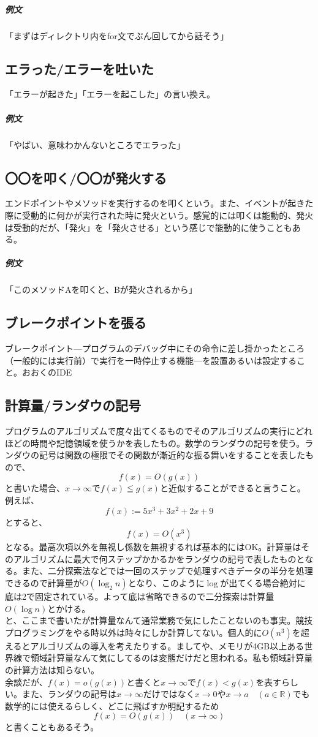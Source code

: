 \documentclass[dvipdfmx,jb5]{jreport}
\begin{document}
\subparagraph{例文}「まずはディレクトリ内をfor文でぶん回してから話そう」

\subsection{エラった/エラーを吐いた}
「エラーが起きた」「エラーを起こした」の言い換え。

\subparagraph{例文}「やばい、意味わかんないところでエラった」

\subsection{〇〇を叩く/〇〇が発火する}
エンドポイントやメソッドを実行するのを叩くという。また、イベントが起きた際に受動的に何かが実行された時に発火という。感覚的には叩くは能動的、発火は受動的だが、「発火」を「発火させる」という感じで能動的に使うこともある。

\subparagraph{例文}「このメソッドAを叩くと、Bが発火されるから」


\subsection{ブレークポイントを張る}
ブレークポイント---プログラムのデバッグ中にその命令に差し掛かったところ（一般的には実行前）で実行を一時停止する機能---を設置あるいは設定すること。おおくのIDE

\subsection{計算量/ランダウの記号}
プログラムのアルゴリズムで度々出てくるものでそのアルゴリズムの実行にどれほどの時間や記憶領域を使うかを表したもの。数学のランダウの記号を使う。ランダウの記号は関数の極限でその関数が漸近的な振る舞いをすることを表したもので、\[
      f(x) = O(g(x))
\]
と書いた場合、$x \to \infty$で$f(x) \leqq g(x)$と近似することができると言うこと。例えば、\[
      f(x) := 5x^3 + 3x^2 + 2x + 9
\]
とすると、\[
      f(x) = O(x^3)
\]
となる。最高次項以外を無視し係数を無視するれば基本的にはOK。計算量はそのアルゴリズムに最大で何ステップかかるかをランダウの記号で表したものとなる。また、二分探索法などでは一回のステップで処理すべきデータの半分を処理できるので計算量が$O(\log_2 n)$となり、このように$\log$が出てくる場合絶対に底は2で固定されている。よって底は省略できるので二分探索は計算量$O(\log n)$とかける。
\\

と、ここまで書いたが計算量なんて通常業務で気にしたことないのも事実。競技プログラミングをやる時以外は時々にしか計算してない。個人的に$O(n^3)$を超えるとアルゴリズムの導入を考えたりする。ましてや、メモリが4GB以上ある世界線で領域計算量なんて気にしてるのは変態だけだと思われる。私も領域計算量の計算方法は知らない。
\\

余談だが、$f(x) = o(g(x))$と書くと$x \to \infty$で$f(x) < g(x)$を表すらしい。また、ランダウの記号は$x \to \infty$だけではなく$x \to 0$や$x \to a \quad (a \in \mathbb{R})$でも数学的には使えるらしく、どこに飛ばすか明記するため\[f(x) = O(g(x)) \quad (x \to \infty)\]と書くこともあるそう。
\end{document}

